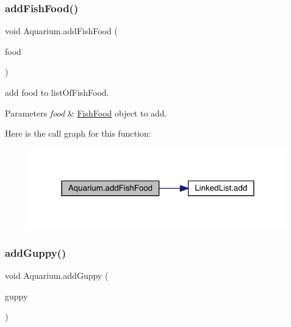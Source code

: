 \subsubsection{\texorpdfstring{add\+Fish\+Food()}{addFishFood()}}
{\footnotesize\ttfamily void Aquarium.\+add\+Fish\+Food (\begin{DoxyParamCaption}\item[{\mbox{\hyperlink{class_fish_food}{Fish\+Food}}}]{food }\end{DoxyParamCaption})\hspace{0.3cm}{\ttfamily [inline]}}

add food to list\+Of\+Fish\+Food. 
\begin{DoxyParams}{Parameters}
{\em food} & \mbox{\hyperlink{class_fish_food}{Fish\+Food}} object to add. \\
\hline
\end{DoxyParams}
Here is the call graph for this function\+:
\nopagebreak
\begin{figure}[H]
\begin{center}
\leavevmode
\includegraphics[width=316pt]{class_aquarium_a36020897197a43587bcedc6aaf617a0f_cgraph}
\end{center}
\end{figure}
\mbox{\label{class_aquarium_a4deb3514c2e387b5d3e33424c18144c1}} 
\subsubsection{\texorpdfstring{add\+Guppy()}{addGuppy()}}
{\footnotesize\ttfamily void Aquarium.\+add\+Guppy (\begin{DoxyParamCaption}\item[{\mbox{\hyperlink{class_guppy}{Guppy}}}]{guppy }\end{DoxyParamCaption})\hspace{0.3cm}{\ttfamily [inline]}}

